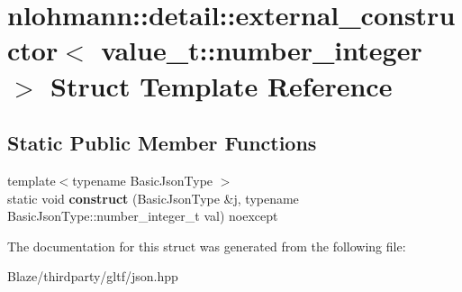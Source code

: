 \hypertarget{structnlohmann_1_1detail_1_1external__constructor_3_01value__t_1_1number__integer_01_4}{}\section{nlohmann\+:\+:detail\+:\+:external\+\_\+constructor$<$ value\+\_\+t\+:\+:number\+\_\+integer $>$ Struct Template Reference}
\label{structnlohmann_1_1detail_1_1external__constructor_3_01value__t_1_1number__integer_01_4}
\subsection*{Static Public Member Functions}
\begin{DoxyCompactItemize}
\item 
\mbox{\label{structnlohmann_1_1detail_1_1external__constructor_3_01value__t_1_1number__integer_01_4_a7c3949672ddb45095cc2527635feef0b}} 
{\footnotesize template$<$typename Basic\+Json\+Type $>$ }\\static void {\bfseries construct} (Basic\+Json\+Type \&j, typename Basic\+Json\+Type\+::number\+\_\+integer\+\_\+t val) noexcept
\end{DoxyCompactItemize}


The documentation for this struct was generated from the following file\+:\begin{DoxyCompactItemize}
\item 
Blaze/thirdparty/gltf/json.\+hpp\end{DoxyCompactItemize}
